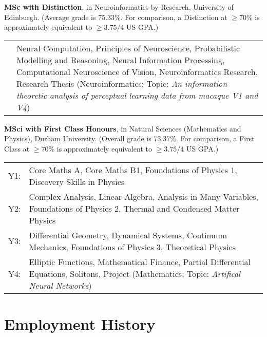 \documentclass[11pt, a4paper]{article} %
\newcommand{\years}[1]{\marginnote{\scriptsize #1}} %
\renewenvironment{itemize}{
  \begin{list}{}{
    \setlength{\leftmargin}{0em}
  }
}{
  \end{list}
}
\begin{document}
\begin{itemize}
\item \years{2011--2012}\textbf{MSc with Distinction}, in Neuroinformatics by Research, University of Edinburgh. {\footnotesize(Average grade is $75.33\%$.
For comparison, a Distinction at $\ge70\%$ is approximately equivalent to $\ge3.75/4$ US GPA.)}\\
{\footnotesize
\begin{tabular}{lp{11.5cm}}
 &Neural Computation, Principles of Neuroscience, Probabilistic Modelling and Reasoning, Neural Information Processing, Computational Neuroscience of Vision, Neuroinformatics Research, Research Thesis (Neuroinformatics; Topic: \emph{An information theoretic analysis of perceptual learning data from macaque V1 and V4})\\
\end{tabular}
}
\item \years{2007--2011}\textbf{MSci with First Class Honours}, in Natural Sciences (Mathematics and Physics), Durham University. {\footnotesize(Overall grade is $73.37\%$.
For comparison, a First Class at $\ge70\%$ is approximately equivalent to $\ge3.75/4$ US GPA.)}\\
{\footnotesize
\begin{tabular}{lp{11.5cm}}
Y1:&Core Maths A, Core Maths B1, Foundations of Physics 1, Discovery Skills in Physics\\
Y2:&Complex Analysis, Linear Algebra, Analysis in Many Variables, Foundations of Physics 2, Thermal and Condensed Matter Physics\\
Y3:&Differential Geometry, Dynamical Systems, Continuum Mechanics, Foundations of Physics 3, Theoretical Physics\\
Y4:&Elliptic Functions, Mathematical Finance, Partial Differential Equations, Solitons, Project (Mathematics; Topic: \emph{Artifical Neural Networks})\\
\end{tabular}
}
\end{itemize}


\section*{Employment History}
\end{document}
